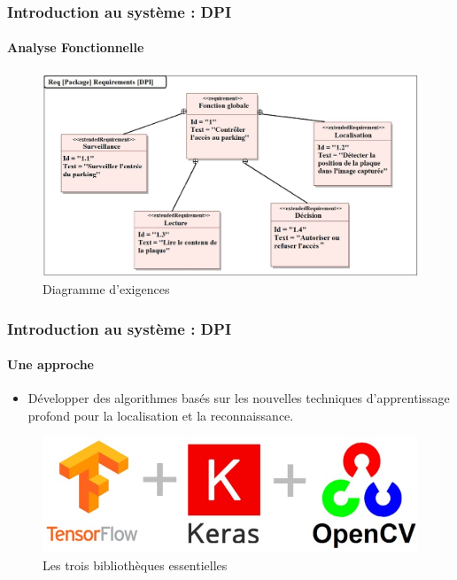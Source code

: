\begin{frame}
\frametitle{Introduction au système : DPI}
\framesubtitle{Analyse Fonctionnelle}
\captionsetup{justification=centering}

\begin{figure}
    \centering\includegraphics[width=0.9\linewidth]{figures/Req.PNG}\caption{Diagramme d'exigences}
\end{figure}
\end{frame}
\begin{frame}
\frametitle{Introduction au système : DPI}
\framesubtitle{Une approche}

\begin{itemize}
    \item	<1>    Développer des algorithmes basés sur les nouvelles techniques d'apprentissage profond pour la localisation et la reconnaissance.
\end{itemize}
\begin{figure}
    \includegraphics[width=1\linewidth]{figures/Biblio.PNG}\caption{Les trois bibliothèques essentielles}
\end{figure}
        
\end{frame}